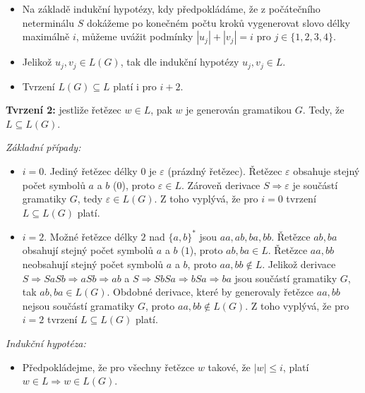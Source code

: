 \documentclass[11pt, a4paper, titlepage]{article}
\begin{document}
\begin{itemize}
    \item Na základě indukční hypotézy, kdy předpokládáme, že z počátečního neterminálu $S$ dokážeme po konečném počtu kroků vygenerovat slovo délky maximálně $i$, můžeme uvážit podmínky $|u_j| + |v_j| = i$ pro $j \in \{1, 2, 3, 4\}$.

    \item Jelikož $u_j, v_j \in L(G)$, tak dle indukční hypotézy $u_j, v_j \in L$.

    \item Tvrzení $L(G) \subseteq L$ platí i pro $i + 2$.
\end{itemize}
\newpage



\textbf{Tvrzení 2:} jestliže řetězec $w \in L$, pak $w$ je generován gramatikou $G$. Tedy, že $L \subseteq L(G)$.
\bigskip

\textit{Základní případy:}

\begin{itemize}
    \item $i = 0$. Jediný řetězec délky $0$ je $\varepsilon$ (prázdný řetězec). Řetězec $\varepsilon$ obsahuje stejný počet symbolů $a$ a $b$ ($0$), proto $\varepsilon \in L$. Zároveň derivace $S \Rightarrow \varepsilon$ je součástí gramatiky $G$, tedy $\varepsilon \in L(G)$. Z toho vyplývá, že pro $i = 0$ tvrzení $L \subseteq L(G)$ platí.

    \item $i = 2$. Možné řetězce délky $2$ nad $\{ a, b \}^*$ jsou $aa, ab, ba, bb$. Řetězce $ab, ba$ obsahují stejný počet symbolů $a$ a $b$ ($1$), proto $ab, ba \in L$. Řetězce $aa, bb$ neobsahují stejný počet symbolů $a$ a $b$, proto $aa, bb \notin L$. Jelikož derivace $S \Rightarrow SaSb \Rightarrow aSb \Rightarrow ab$ a $S \Rightarrow SbSa \Rightarrow bSa \Rightarrow ba$ jsou součástí gramatiky $G$, tak $ab, ba \in L(G)$. Obdobné derivace, které by generovaly řetězce $aa, bb$ nejsou součástí gramatiky $G$, proto $aa, bb \notin L(G)$. Z toho vyplývá, že pro $i = 2$ tvrzení $L \subseteq L(G)$ platí.
\end{itemize}

\medskip
\textit{Indukční hypotéza:}

\begin{itemize}
    \item Předpokládejme, že pro všechny řetězce $w$ takové, že $|w| \leq i$, platí $w \in L \Rightarrow w \in L(G)$.
\end{itemize}
\end{document}
